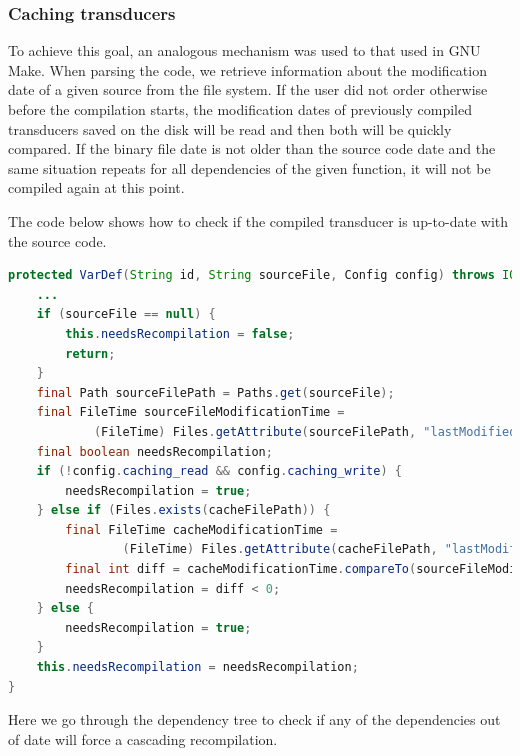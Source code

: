 \hypertarget{caching-transducers}{%
\subsubsection{Caching transducers}\label{caching-transducers}}

To achieve this goal, an analogous mechanism was used to that used in
GNU Make. When parsing the code, we retrieve information about the
modification date of a given source from the file system. If the user
did not order otherwise before the compilation starts, the modification
dates of previously compiled transducers saved on the disk will be read
and then both will be quickly compared. If the binary file date is not
older than the source code date and the same situation repeats for all
dependencies of the given function, it will not be compiled again at
this point.

The code below shows how to check if the compiled transducer is
up-to-date with the source code.

\begin{lstlisting}[language=Java, frame=single]
protected VarDef(String id, String sourceFile, Config config) throws IOException {
    ...
    if (sourceFile == null) {
        this.needsRecompilation = false;
        return;
    }
    final Path sourceFilePath = Paths.get(sourceFile);
    final FileTime sourceFileModificationTime =
            (FileTime) Files.getAttribute(sourceFilePath, "lastModifiedTime");
    final boolean needsRecompilation;
    if (!config.caching_read && config.caching_write) {
        needsRecompilation = true;
    } else if (Files.exists(cacheFilePath)) {
        final FileTime cacheModificationTime =
                (FileTime) Files.getAttribute(cacheFilePath, "lastModifiedTime");
        final int diff = cacheModificationTime.compareTo(sourceFileModificationTime);
        needsRecompilation = diff < 0;
    } else {
        needsRecompilation = true;
    }
    this.needsRecompilation = needsRecompilation;
}
\end{lstlisting}

Here we go through the dependency tree to check if any of the
dependencies out of date will force a cascading recompilation. 


